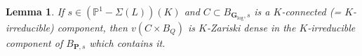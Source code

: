 \documentclass[10pt]{article}
\numberwithin{equation}{section}
\theoremstyle{plain}
\newtheorem{lem}[thm]{Lemma}
\theoremstyle{definition}
\theoremstyle{remark}
\newcommand{\GL}{\operatorname{GL}}
\begin{document}
\begin{lem}
\label{imIlem}
If $s \in (\mathbb{P}^1 - \Sigma(L))(K)$ and $C \subset B_{\mathbf{G}_{\operatorname{log}},s}$ is a $K$-connected (= $K$-irreducible) component, then $v(C \times B_{Q})$ is $K$-Zariski dense in the $K$-irreducible component of $B_{\mathbf{P},s}$ which contains it.
\end{lem}




\end{document}
